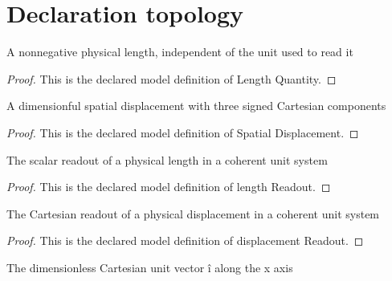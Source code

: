 \section{Declaration topology}
\begin{definition}
  \label{def:physics:phyx-mini-0682:phyxminiproblems-problemphyxmini0682-lengthquantity}
  A nonnegative physical length, independent of the unit used to read it
\end{definition}
\begin{proof}
  This is the declared model definition of Length Quantity.
\end{proof}
\begin{definition}
  \label{def:physics:phyx-mini-0682:phyxminiproblems-problemphyxmini0682-spatialdisplacement}
  A dimensionful spatial displacement with three signed Cartesian components
\end{definition}
\begin{proof}
  This is the declared model definition of Spatial Displacement.
\end{proof}
\begin{definition}
  \label{def:physics:phyx-mini-0682:phyxminiproblems-problemphyxmini0682-lengthreadout}
  The scalar readout of a physical length in a coherent unit system
\end{definition}
\begin{proof}
  This is the declared model definition of length Readout.
\end{proof}
\begin{definition}
  \label{def:physics:phyx-mini-0682:phyxminiproblems-problemphyxmini0682-displacementreadout}
  The Cartesian readout of a physical displacement in a coherent unit system
\end{definition}
\begin{proof}
  This is the declared model definition of displacement Readout.
\end{proof}
\begin{definition}[i Hat]
  \label{def:physics:phyx-mini-0682:phyxminiproblems-problemphyxmini0682-ihat}
  The dimensionless Cartesian unit vector î along the x axis
\end{definition}
